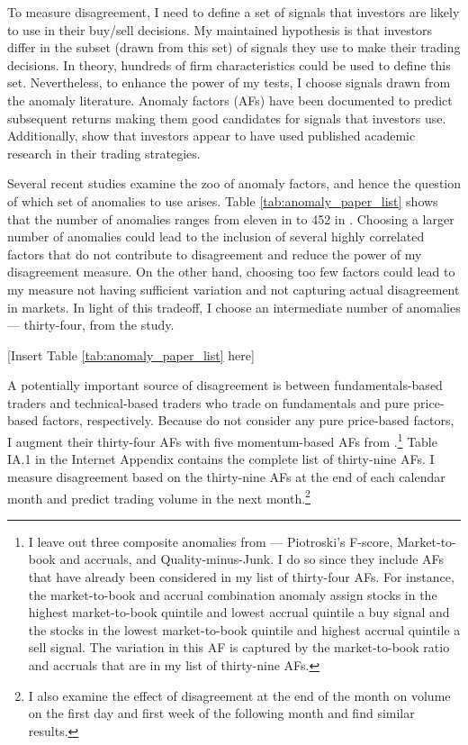 \documentclass[
  12pt,
  a4paper,
  twoside,
  onecolumn]{article}
\begin{document}
To measure disagreement, I need to define a set of signals that
investors are likely to use in their buy/sell decisions. My maintained
hypothesis is that investors differ in the subset (drawn from this set)
of signals they use to make their trading decisions. In theory, hundreds
of firm characteristics could be used to define this set. Nevertheless,
to enhance the power of my tests, I choose signals drawn from the
anomaly literature. Anomaly factors (AFs) have been documented to
predict subsequent returns making them good candidates for signals that
investors use. Additionally, \cite{mclean_pontiff2016} show that
investors appear to have used published academic research in their
trading strategies.

Several recent studies examine the zoo of anomaly factors, and hence the
question of which set of anomalies to use arises. Table
\ref{tab:anomaly_paper_list} shows that the number of anomalies ranges
from eleven in \cite{stambaugh_etal_2012} to 452 in
\cite{replicating_anomalies_2020}. Choosing a larger number of anomalies
could lead to the inclusion of several highly correlated factors that do
not contribute to disagreement and reduce the power of my disagreement
measure. On the other hand, choosing too few factors could lead to my
measure not having sufficient variation and not capturing actual
disagreement in markets. In light of this tradeoff, I choose an
intermediate number of anomalies --- thirty-four, from the
\cite{roberts2018} study.

\begin{center} { [Insert Table \ref{tab:anomaly_paper_list} here] } \end{center}

A potentially important source of disagreement is between
fundamentals-based traders and technical-based traders who trade on
fundamentals and pure price-based factors, respectively. Because
\cite{roberts2018} do not consider any pure price-based factors, I
augment their thirty-four AFs with five momentum-based AFs from
\cite{mclean_pontiff2016}.\footnote{I leave out three composite
  anomalies from \cite{roberts2018} --- Piotroski's F-score,
  Market-to-book and accruals, and Quality-minus-Junk. I do so since
  they include AFs that have already been considered in my list of
  thirty-four AFs. For instance, the market-to-book and accrual
  combination anomaly assign stocks in the highest market-to-book
  quintile and lowest accrual quintile a buy signal and the stocks in
  the lowest market-to-book quintile and highest accrual quintile a sell
  signal. The variation in this AF is captured by the market-to-book
  ratio and accruals that are in my list of thirty-nine AFs.} Table IA.1
in the Internet Appendix contains the complete list of thirty-nine AFs.
I measure disagreement based on the thirty-nine AFs at the end of each
calendar month and predict trading volume in the next month.\footnote{I
  also examine the effect of disagreement at the end of the month on
  volume on the first day and first week of the following month and find
  similar results.}
\end{document}
